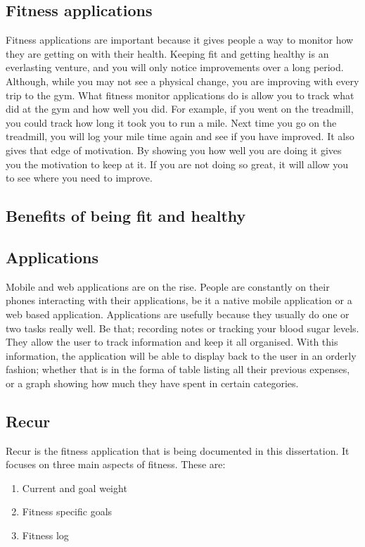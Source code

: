 \subsection{Fitness applications}
Fitness applications are important because it gives people a way to monitor how they are getting on with their health. Keeping fit and getting healthy is an everlasting venture, and you will only notice improvements over a long period. Although, while you may not see a physical change, you are improving with every trip to the gym. What fitness monitor applications do is allow you to track what did at the gym and how well you did. For example, if you went on the treadmill, you could track how long it took you to run a mile. Next time you go on the treadmill, you will log your mile time again and see if you have improved. It also gives that edge of motivation. By showing you how well you are doing it gives you the motivation to keep at it. If you are not doing so great, it will allow you to see where you need to improve.\\

\subsection{Benefits of being fit and healthy}

\subsection{Applications}
Mobile and web applications are on the rise. People are constantly on their phones interacting with their applications, be it a native mobile application or a web based application. Applications are usefully because they usually do one or two tasks really well. Be that; recording notes or tracking your blood sugar levels. They allow the user to track information and keep it all organised. With this information, the application will be able to display back to the user in an orderly fashion; whether that is in the forma of table listing all their previous expenses, or a graph showing how much they have spent in certain categories.

\subsection{Recur}
Recur is the fitness application that is being documented in this dissertation. It focuses on three main aspects of fitness. These are:

\begin{enumerate}
\item {Current and goal weight}
\item {Fitness specific goals}
\item {Fitness log}
\end{enumerate}

